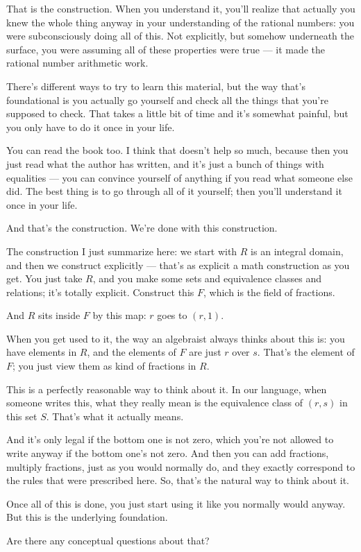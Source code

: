 \begin{speech}[01:07:25 - 01:08:00]
That is the construction. When you understand it, you'll realize that actually you knew the whole thing anyway in your understanding of the rational numbers: you were subconsciously doing all of this. Not explicitly, but somehow underneath the surface, you were assuming all of these properties were true --- it made the rational number arithmetic work.

There's different ways to try to learn this material, but the way that's foundational is you actually go yourself and check all the things that you're supposed to check. That takes a little bit of time and it's somewhat painful, but you only have to do it once in your life.

You can read the book too. I think that doesn't help so much, because then you just read what the author has written, and it's just a bunch of things with equalities --- you can convince yourself of anything if you read what someone else did. The best thing is to go through all of it yourself; then you'll understand it once in your life.

And that's the construction. We're done with this construction.
\end{speech}

\begin{speech}[01:08:00 - 01:09:44]
The construction I just summarize here:  we start with $R$ is an integral domain,  and then we construct explicitly --- that's as explicit a math construction as you get. You just take $R$, and you make some sets and equivalence classes and relations; it's totally explicit. Construct this $F$, which is the field of fractions. 

And $R$ sits inside $F$ by this map: $r$ goes to $(r, 1)$. 

When you get used to it, the way an algebraist always thinks about this is: you have elements in $R$,  and the elements of $F$ are just $r$ over $s$. That's the element of $F$; you just view them as kind of fractions in $R$. 

This is a perfectly reasonable way to think about it. In our language, when someone writes this, what they really mean is the equivalence class of $(r, s)$ in this set $S$. That's what it actually means. 

And it's only legal if the bottom one is not zero, which you're not allowed to write anyway if the bottom one's not zero. And then you can add fractions, multiply fractions, just as you would normally do, and they exactly correspond to the rules that were prescribed here. So, that's the natural way to think about it.

Once all of this is done, you just start using it like you normally would anyway. But this is the underlying foundation.

Are there any conceptual questions about that?
\end{speech}

